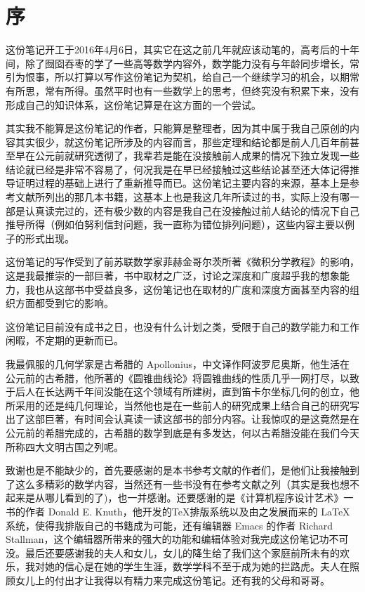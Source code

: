 
\chapter*{序}
\thispagestyle{empty}

这份笔记开工于2016年4月6日，其实它在这之前几年就应该动笔的，高考后的十年间，除了囫囵吞枣的学了一些高等数学内容外，数学能力没有与年龄同步增长，常引为恨事，所以打算以写作这份笔记为契机，给自己一个继续学习的机会，以期常有所思，常有所得。虽然平时也有一些数学上的思考，但终究没有积累下来，没有形成自己的知识体系，这份笔记算是在这方面的一个尝试。

其实我不能算是这份笔记的作者，只能算是整理者，因为其中属于我自己原创的内容其实很少，就这份笔记所涉及的内容而言，那些定理和结论都是前人几百年前甚至早在公元前就研究透彻了，我辈若是能在没接触前人成果的情况下独立发现一些结论就已经是非常不容易了，何况我是在早已经接触过这些结论甚至还大体记得推导证明过程的基础上进行了重新推导而已。这份笔记主要内容的来源，基本上是参考文献所列出的那几本书籍，这基本上也是我这几年所读过的书，实际上没有哪一部是认真读完过的，还有极少数的内容是我自己在没接触过前人结论的情况下自己推导所得（例如伯努利信封问题，我一直称为错位排列问题），这些内容主要以例子的形式出现。

这份笔记的写作受到了前苏联数学家菲赫金哥尔茨所著《微积分学教程》的影响，这是我最推崇的一部巨著，书中取材之广泛，讨论之深度和广度超乎我的想象能力，我也从这部书中受益良多，这份笔记也在取材的广度和深度方面甚至内容的组织方面都受到它的影响。

这份笔记目前没有成书之日，也没有什么计划之类，受限于自己的数学能力和工作闲暇，不定期的更新而已。

我最佩服的几何学家是古希腊的 Apollonius，中文译作阿波罗尼奥斯，他生活在公元前的古希腊，他所著的《圆锥曲线论》将圆锥曲线的性质几乎一网打尽，以致于后人在长达两千年间没能在这个领域有所建树，直到笛卡尔坐标几何的创立，他所采用的还是纯几何理论，当然他也是在一些前人的研究成果上结合自己的研究写出了这部巨著，有时间会认真读一读这部书的部分内容。让我惊叹的是这竟然是在公元前的希腊完成的，古希腊的数学到底是有多发达，何以古希腊没能在我们今天所称四大文明古国之列呢。

致谢也是不能缺少的，首先要感谢的是本书参考文献的作者们，是他们让我接触到了这么多精彩的数学内容，当然还有一些书没有在参考文献之列（其实是我也想不起来是从哪儿看到的了)，也一并感谢。还要感谢的是《计算机程序设计艺术》一书的作者 Donald E. Knuth，他开发的\TeX 排版系统以及由之发展而来的 \LaTeX 系统，使得我排版自己的书籍成为可能，还有编辑器 Emacs 的作者 Richard Stallman，这个编辑器所带来的强大的功能和编辑体验对我完成这份笔记功不可没。最后还要感谢我的夫人和女儿，女儿的降生给了我们这个家庭前所未有的欢乐，我对她的信心是在她的学生生涯，数学学科不至于成为她的拦路虎。夫人在照顾女儿上的付出才让我得以有精力来完成这份笔记。还有我的父母和哥哥。

